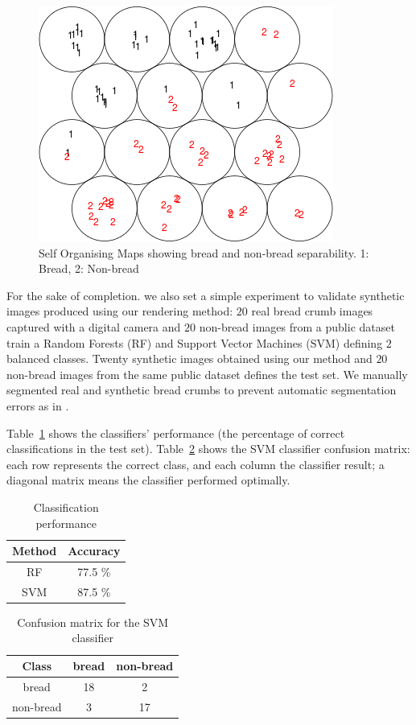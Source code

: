 \documentclass[final,5p,times]{elsarticle}
\begin{document}
\begin{figure}[h!]
\includegraphics[scale=0.65]{som.png}
\caption{Self Organising Maps showing bread and non-bread separability. 1: Bread, 2: Non-bread }
\label{FigSOM}
\end{figure}

For the sake of completion. we also set a simple experiment to validate synthetic images produced using our rendering method: $20$ real bread crumb images captured with a digital camera and $20$ non-bread images from a public dataset \cite{FeiFei2004} train a Random Forests (RF) \cite{Breiman2001} and Support Vector Machines (SVM) \cite{Vapnik1995} defining $2$ balanced classes. Twenty synthetic images obtained using our method and $20$ non-bread images from the same public dataset defines the test set. We manually segmented real and synthetic bread crumbs to prevent automatic segmentation errors as in \cite{Bosch2011}.


Table~\ref{Table1} shows the classifiers' performance (the percentage of correct classifications in the test set). Table~\ref{Table2} shows the SVM classifier confusion matrix: each row represents the correct class, and each column the classifier result; a diagonal matrix means the classifier performed optimally.

\begin{table}[htb]
\centering
\begin{tabular}{c|c}
\hline
 Method & Accuracy  \\
\hline
 RF & 77.5 \% \\
SVM  & 87.5 \% \\
\hline
\end{tabular}
\caption{Classification performance }
\label{Table1}
\end{table}

\begin{table}[htb]
\centering
\begin{tabular}{c|c|c}
\hline
 Class & bread & non-bread  \\
 \hline
bread & 18 & 2  \\
 non-bread & 3 & 17  \\
 \hline
\end{tabular}
\caption{Confusion matrix for the SVM classifier}
\label{Table2}
\end{table}
\end{document}
